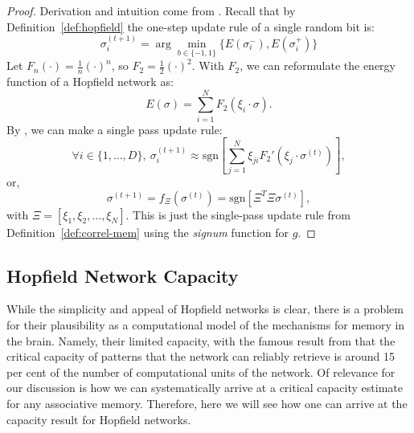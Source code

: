 \documentclass{article}
\theoremstyle{definition}
\begin{document}
\begin{proof}
    Derivation and intuition come from \textcite{krotov_modern_2025}.
    Recall that by Definition~\ref{def:hopfield} the one-step update rule of a 
    single random bit is:
    \begin{equation}\label{proof:random-update}
    \sigma_i^{(t+1)} = \arg\min_{b \in \{-1, 1\}} \{ E(\sigma_i^-), E(\sigma_i^+) \}
    \end{equation}
    Let $F_n (\cdot) = \frac{1}{n} (\cdot)^n$, so $F_2 = \frac{1}{2} (\cdot)^2$.
    With $F_2$, we can reformulate the energy function of a Hopfield network as:
    \begin{equation}\label{hopfield:f_n}
        E(\sigma) = \sum^N_{i=1} F_2 (\xi_i \cdot \sigma).
    \end{equation}
    By \textcite{krotov_modern_2025}, we can make a single pass update rule:
    \begin{equation}\label{eq:krotov-energy-deriv}
    \forall i \in \{1, \dots, D\},~\sigma_i^{(t+1)} \approx \text{sgn} \left[ \sum^N_{j=1} \xi_{ji} F_2' \left( \xi_j \cdot \sigma^{(t)}  \right) \right],
    \end{equation}
    or,
    \begin{equation}
        \sigma^{(t+1)} = f_\Xi (\sigma^{(t)}) = \text{sgn} \left[ \Xi^T \Xi \sigma^{(t)} \right],
    \end{equation}
    with $\Xi = [\xi_1, \xi_2, \dots, \xi_N]$.
    This is just the single-pass update rule from Definition~\ref{def:correl-mem}
    using the \textit{signum} function for $g$.
\end{proof}

\subsection{Hopfield Network Capacity}\label{sec:hopfield-cap}

While the simplicity and appeal of Hopfield networks is clear, there is a problem
for their plausibility as a computational model of the mechanisms for memory in 
the brain. Namely, their limited capacity, with the famous result from 
\textcite{hopfield_neural_1982} that the critical capacity of patterns 
that the network can reliably retrieve is around 15 per cent of the number of computational
units of the network. Of relevance for our discussion is how we can systematically
arrive at a critical capacity estimate for any associative memory. Therefore,
here we will see how one can arrive at the capacity result for Hopfield networks.
\end{document}

